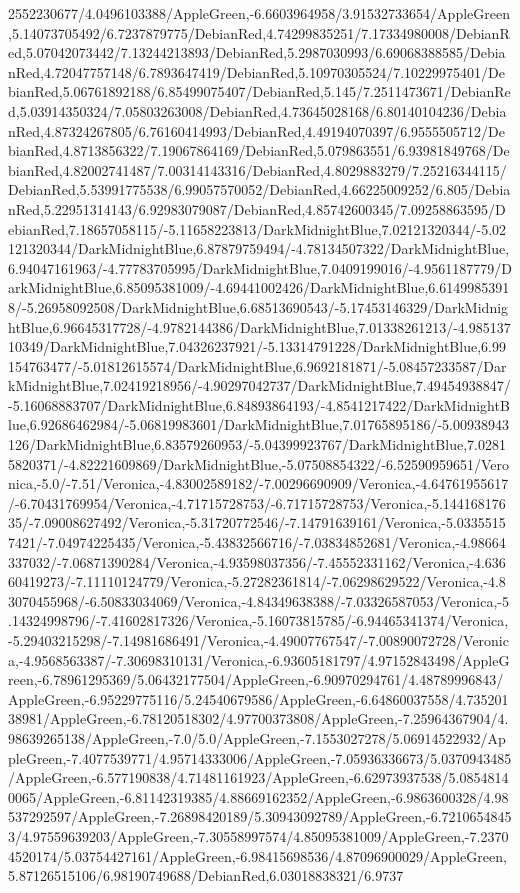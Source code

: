 {\begin{tikzternal}
2552230677/4.0496103388/AppleGreen,-6.6603964958/3.91532733654/AppleGreen,5.14073705492/6.7237879775/DebianRed,4.74299835251/7.17334980008/DebianRed,5.07042073442/7.13244213893/DebianRed,5.2987030993/6.69068388585/DebianRed,4.72047757148/6.7893647419/DebianRed,5.10970305524/7.10229975401/DebianRed,5.06761892188/6.85499075407/DebianRed,5.145/7.2511473671/DebianRed,5.03914350324/7.05803263008/DebianRed,4.73645028168/6.80140104236/DebianRed,4.87324267805/6.76160414993/DebianRed,4.49194070397/6.9555505712/DebianRed,4.8713856322/7.19067864169/DebianRed,5.079863551/6.93981849768/DebianRed,4.82002741487/7.00314143316/DebianRed,4.8029883279/7.25216344115/DebianRed,5.53991775538/6.99057570052/DebianRed,4.66225009252/6.805/DebianRed,5.22951314143/6.92983079087/DebianRed,4.85742600345/7.09258863595/DebianRed,7.18657058115/-5.11658223813/DarkMidnightBlue,7.02121320344/-5.02121320344/DarkMidnightBlue,6.87879759494/-4.78134507322/DarkMidnightBlue,6.94047161963/-4.77783705995/DarkMidnightBlue,7.0409199016/-4.9561187779/DarkMidnightBlue,6.85095381009/-4.69441002426/DarkMidnightBlue,6.61499853918/-5.26958092508/DarkMidnightBlue,6.68513690543/-5.17453146329/DarkMidnightBlue,6.96645317728/-4.9782144386/DarkMidnightBlue,7.01338261213/-4.98513710349/DarkMidnightBlue,7.04326237921/-5.13314791228/DarkMidnightBlue,6.99154763477/-5.01812615574/DarkMidnightBlue,6.9692181871/-5.08457233587/DarkMidnightBlue,7.02419218956/-4.90297042737/DarkMidnightBlue,7.49454938847/-5.16068883707/DarkMidnightBlue,6.84893864193/-4.8541217422/DarkMidnightBlue,6.92686462984/-5.06819983601/DarkMidnightBlue,7.01765895186/-5.00938943126/DarkMidnightBlue,6.83579260953/-5.04399923767/DarkMidnightBlue,7.02815820371/-4.82221609869/DarkMidnightBlue,-5.07508854322/-6.52590959651/Veronica,-5.0/-7.51/Veronica,-4.83002589182/-7.00296690909/Veronica,-4.64761955617/-6.70431769954/Veronica,-4.71715728753/-6.71715728753/Veronica,-5.14416817635/-7.09008627492/Veronica,-5.31720772546/-7.14791639161/Veronica,-5.03355157421/-7.04974225435/Veronica,-5.43832566716/-7.03834852681/Veronica,-4.98664337032/-7.06871390284/Veronica,-4.93598037356/-7.45552331162/Veronica,-4.63660419273/-7.11110124779/Veronica,-5.27282361814/-7.06298629522/Veronica,-4.83070455968/-6.50833034069/Veronica,-4.84349638388/-7.03326587053/Veronica,-5.14324998796/-7.41602817326/Veronica,-5.16073815785/-6.94465341374/Veronica,-5.29403215298/-7.14981686491/Veronica,-4.49007767547/-7.00890072728/Veronica,-4.9568563387/-7.30698310131/Veronica,-6.93605181797/4.97152843498/AppleGreen,-6.78961295369/5.06432177504/AppleGreen,-6.90970294761/4.48789996843/AppleGreen,-6.95229775116/5.24540679586/AppleGreen,-6.64860037558/4.73520138981/AppleGreen,-6.78120518302/4.97700373808/AppleGreen,-7.25964367904/4.98639265138/AppleGreen,-7.0/5.0/AppleGreen,-7.1553027278/5.06914522932/AppleGreen,-7.4077539771/4.95714333006/AppleGreen,-7.05936336673/5.0370943485/AppleGreen,-6.577190838/4.71481161923/AppleGreen,-6.62973937538/5.08548140065/AppleGreen,-6.81142319385/4.88669162352/AppleGreen,-6.9863600328/4.98537292597/AppleGreen,-7.26898420189/5.30943092789/AppleGreen,-6.72106548453/4.97559639203/AppleGreen,-7.30558997574/4.85095381009/AppleGreen,-7.23704520174/5.03754427161/AppleGreen,-6.98415698536/4.87096900029/AppleGreen,5.87126515106/6.98190749688/DebianRed,6.03018838321/6.9737
\end{tikzternal}}
